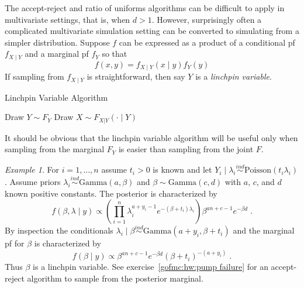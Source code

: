 \documentclass[12pt]{article}
\theoremstyle{plain}
\theoremstyle{definition}
\theoremstyle{remark}
\newtheorem{example}{Example}[section]
\begin{document}
The accept-reject and ratio of uniforms algorithms can be difficult to
apply in multivariate settings, that is, when $d > 1$. However,
surprisingly often a complicated multivariate simulation setting can
be converted to simulating from a simpler distribution.  Suppose $f$
can be expressed as a product of a conditional pf $f_{X \mid Y}$ and
a marginal pf $f_{Y}$ so that
\[
f(x, y) = f_{X \mid Y}(x\mid y) f_{Y}(y)
\]
If sampling from $f_{X \mid Y}$ is straightforward, then say $Y$ is a
{\em linchpin variable}.

\begin{algorithm}[H]
 \caption{Linchpin Variable Algorithm} \label{gofmc:alg:lv}
 \begin{algorithmic}[1]
   \State Draw $Y \sim F_Y$ 
   \State Draw $X \sim F_{X|Y}(\cdot \mid Y)$
 \end{algorithmic}
\end{algorithm}

It should be obvious that the linchpin variable algorithm will be
useful only when sampling from the marginal $F_Y$ is easier than
sampling from the joint $F$.

\begin{example}
\label{gofmc:ex:pump failure}
For $i=1, \ldots, n$ assume $t_i > 0$ is known and let
$Y_{i} \mid \lambda_i \stackrel{ind}{\sim} \text{Poisson}(t_i
\lambda_i)$.  Assume priors
$\lambda_i \stackrel{ind}{\sim} \text{Gamma}(a, \beta)$ and
$\beta \sim \text{Gamma}(c, d)$ with $a$, $c$, and $d$ known positive
constants. The posterior is characterized by
$$
f(\beta, \lambda \mid y) \propto \left( \prod_{i=1}^{n} \lambda_{i}^{a +
    y_i - 1} e^{-(\beta+ t_i)\lambda_i}\right) \beta^{an+c-1}
e^{-\beta d} \; .
$$
By inspection the conditionals
$\lambda_i \mid \beta \stackrel{ind}{\sim} \text{Gamma}(a+y_i, \beta +
t_i)$ and the marginal pf for $\beta$ is characterized by
$$
f(\beta \mid y) \propto \beta^{an+c-1} e^{-\beta d} \left( \beta + t_i
\right)^{-(a+y_i)} \; .
$$
Thus $\beta$ is a linchpin variable. See exercise~\ref{gofmc:hw:pump
  failure} for an accept-reject algorithm to sample from the posterior
marginal.
\end{example}
\end{document}

